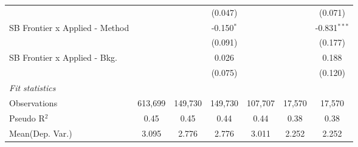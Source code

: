 \begin{tabular}{lcccccc}
                                  &                &                & (0.047)        &                &               & (0.071)\\   
   SB Frontier x Applied - Method &                &                & -0.150$^{*}$   &                &               & -0.831$^{***}$\\   
                                  &                &                & (0.091)        &                &               & (0.177)\\   
   SB Frontier x Applied - Bkg.   &                &                & 0.026          &                &               & 0.188\\   
                                  &                &                & (0.075)        &                &               & (0.120)\\   
   \midrule
   \emph{Fit statistics}\\
   Observations                   & 613,699        & 149,730        & 149,730        & 107,707        & 17,570        & 17,570\\  
   Pseudo R$^2$                   & 0.45           & 0.45           & 0.44           & 0.44           & 0.38          & 0.38\\  
Mean(Dep. Var.) & 3.095 & 2.776 & 2.776 & 3.011 & 2.252 & 2.252 \\
   

\end{tabular}
